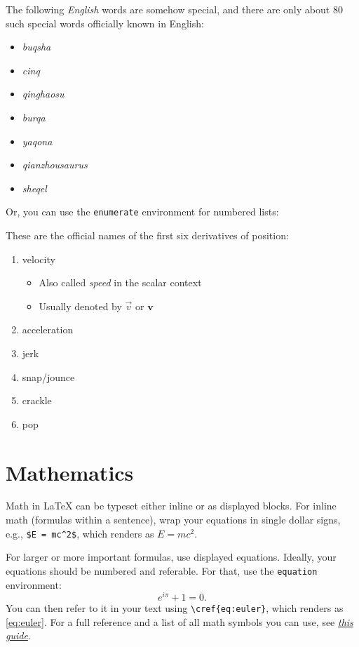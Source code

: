 \begin{displayquote}
    The following \emph{English} words are somehow special, and there are only about 80 such special words officially
    known in English:
    \begin{itemize}
        \item \emph{buqsha}
        \item \emph{cinq}
        \item \emph{qinghaosu}
        \item \emph{burqa}
        \item \emph{yaqona}
        \item \emph{qianzhousaurus}
        \item \emph{sheqel}
    \end{itemize}
\end{displayquote}
Or, you can use the \verb|enumerate| environment for numbered lists:
\begin{displayquote}
    These are the official names of the first six derivatives of position:
    \begin{enumerate}
        \item velocity
        \begin{itemize}
            \item Also called \emph{speed} in the scalar context
            \item Usually denoted by $\vec{v}$ or $\bm{v}$
        \end{itemize}

        \item acceleration
        \item jerk
        \item snap/jounce
        \item crackle
        \item pop
    \end{enumerate}
\end{displayquote}


\section{Mathematics}
\label{sec:math}

Math in \LaTeX{} can be typeset either inline or as displayed blocks. For inline math (formulas within a sentence),
wrap your equations in single dollar signs, e.g., \verb|$E = mc^2$|, which renders as $E = mc^2$.

For larger or more important formulas, use displayed equations. Ideally, your equations should be numbered
and referable. For that, use the \verb|equation| environment:
\begin{equation}
    \label{eq:euler}
    e^{i \pi} + 1 = 0.
\end{equation}
You can then refer to it in your text using \verb|\cref{eq:euler}|, which renders as \cref{eq:euler}. For a full
reference and a list of all math symbols you can use, see
\emph{\href{https://www.overleaf.com/learn/latex/Mathematical\_expressions}{this guide}}.

